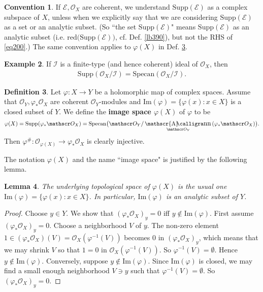 \documentclass[12pt,b5paper,notitlepage]{report}
\theoremstyle{definition}
\newtheorem{df}{Definition}[section]
\newtheorem{eg}[df]{Example}
\newtheorem{cv}[df]{Convention}
\theoremstyle{plain}
\newtheorem{lm}[df]{Lemma}
\DeclareMathOperator{\sann}{\mathscr{A}\text{\kern -3pt {\calligra\large nn}}\,}
\newcommand{\mc}{\mathcal}
\newcommand{\scr}{\mathscr}
\newcommand{\Imag}{\mathrm{Im}}
\newcommand{\Supp}{\mathrm{Supp}}
\newcommand{\Specan}{\mathrm{Specan}}
\newcommand{\red}{\mathrm{red}}
\numberwithin{equation}{section}
\begin{document}
\begin{cv}\label{lb391}
If $\scr E,\scr O_X$ are coherent, we understand $\Supp(\scr E)$ as a complex subspace of $X$, unless when we explicitly say that we are considering $\Supp(\scr E)$ as a set or an analytic subset. (So ``the set $\Supp(\scr E)$" means $\Supp(\scr E)$ as an analytic subset (i.e. $\red\big(\Supp(\scr E)\big)$, cf. Def. \ref{lb390}), but not the RHS of \eqref{eq200}.) The same convention applies to $\varphi(X)$ in Def. \ref{lb76}.
\end{cv}


\begin{eg}
If $\mc I$ is a finite-type (and hence coherent) ideal of $\scr O_X$, then
\begin{align}
\Supp(\scr O_X/\mc I)=\Specan(\scr O_X/\mc I).
\end{align}
\end{eg}


\begin{df}\label{lb76}
Let $\varphi:X\rightarrow Y$ be a holomorphic map of complex spaces. Assume that $\scr O_Y,\varphi_*\scr O_X$ are coherent $\scr O_Y$-modules and $\Imag(\varphi)=\{\varphi(x):x\in X\}$ is a closed subset of $Y$. We define the \textbf{image space $\varphi(X)$}  of $\varphi$ to be
\begin{align}
\varphi(X)=\Supp(\varphi_*\scr O_X)=\Specan\big(\scr O_Y/\sann_{\scr O_Y}(\varphi_*\scr O_X)\big).
\end{align}
Then $\varphi^\#:\scr O_{\varphi(X)}\rightarrow\varphi_*\scr O_X$ is clearly injective.
\end{df}

The notation $\varphi(X)$ and the name ``image space" is justified by the following lemma.

\begin{lm}
The underlying topological space of $\varphi(X)$ is the usual one $\Imag(\varphi)=\{\varphi(x):x\in X\}$. In particular, $\Imag(\varphi)$ is an analytic subset of $Y$.
\end{lm}


\begin{proof}
Choose $y\in Y$. We show that $(\varphi_*\scr O_X)_y=0$ iff $y\notin\Imag(\varphi)$.  First assume $(\varphi_*\scr O_X)_y=0$. Choose a neighborhood $V$ of $y$. The non-zero element $1\in(\varphi_*\scr O_X)(V)=\scr O_X(\varphi^{-1}(V))$ becomes $0$ in $(\varphi_*\scr O_X)_y$, which means that we may shrink $V$ so that $1=0$ in $\scr O_X(\varphi^{-1}(V))$. So $\varphi^{-1}(V)=\emptyset$. Hence $y\notin\Imag(\varphi)$. Conversely, suppose $y\notin\Imag(\varphi)$. Since $\Imag(\varphi)$ is closed, we may find a small enough neighborhood $V\ni y$ such that $\varphi^{-1}(V)=\emptyset$. So $(\varphi_*\scr O_X)_y=0$.
\end{proof}
\end{document}
